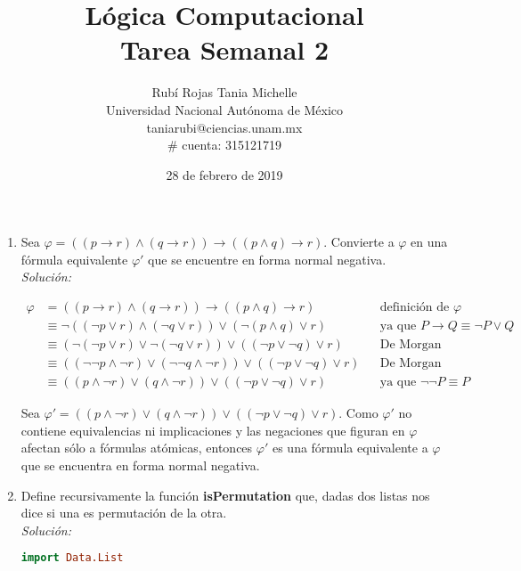 \documentclass[letterpaper,11pt]{article}
\title{Lógica Computacional \\ Tarea Semanal 2}
\author{Rubí Rojas Tania Michelle \\
        Universidad Nacional Autónoma de México \\
        taniarubi@ciencias.unam.mx \\
        \# cuenta: 315121719}
\date{28 de febrero de 2019}
\begin{document}
\maketitle

\begin{enumerate}
   \item Sea $\varphi = ((p \rightarrow r) \land (q \rightarrow r)) 
   \rightarrow ((p \land q) \rightarrow r)$. Convierte a $\varphi$ en una
   fórmula equivalente $\varphi'$ que se encuentre en forma normal negativa.\\
   \textit{Solución:}
   
   \begin{align*}
      \varphi &= ((p \rightarrow r) \land (q \rightarrow r)) 
                 \rightarrow ((p \land q) \rightarrow r) 
              && \text{definición de $\varphi$} \\
              &\equiv \neg ((\neg p \lor r) \land (\neg q \lor r))
                      \lor (\neg (p \land q) \lor r)
              && \text{ya que $P \rightarrow Q \equiv \neg P \lor Q$} \\
              &\equiv (\neg (\neg p \lor r) \lor \neg (\neg q \lor r))
                      \lor ((\neg p \lor \neg q) \lor r)
              && \text{De Morgan} \\
              &\equiv ((\neg \neg p \land \neg r) \lor 
                      (\neg \neg q \land \neg r)) \lor 
                      ((\neg p \lor \neg q) \lor r)
              && \text{De Morgan} \\
              &\equiv ((p \land \neg r) \lor (q \land \neg r))
                      \lor ((\neg p \lor \neg q) \lor r)
              && \text{ya que $\neg \neg P \equiv P$}
   \end{align*}

   Sea $\varphi' = ((p \land \neg r) \lor (q \land \neg r)) \lor 
   ((\neg p \lor \neg q) \lor r)$. Como $\varphi'$ no contiene equivalencias ni 
   implicaciones y las negaciones que figuran en $\varphi$ afectan sólo a 
   fórmulas atómicas, entonces $\varphi'$ es una fórmula equivalente a 
   $\varphi$ que se encuentra en forma normal negativa.
    
   \item Define recursivamente la función \textbf{isPermutation} que, dadas
   dos listas nos dice si una es permutación de la otra.\\
   \textit{Solución:} 
   
   \begin{lstlisting}[language=Haskell]
      import Data.List


\end{lstlisting}
\end{enumerate}
\end{document}
